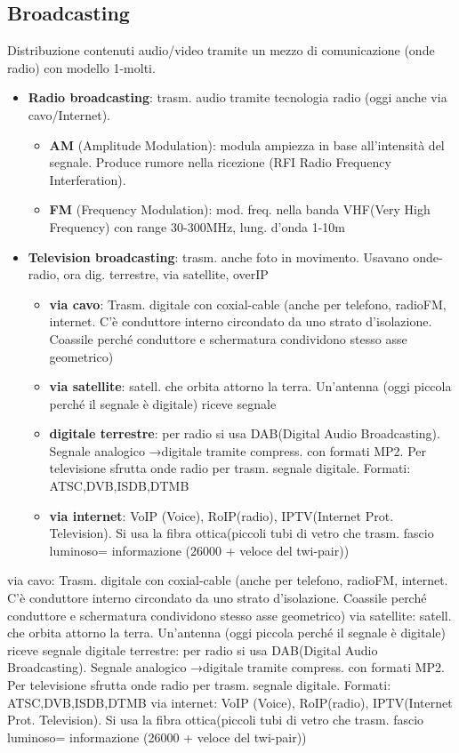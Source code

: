 \documentclass[8pt,a4paper]{article}
\begin{document}
\begin{multicols}{5}
    \subsection{Broadcasting}
    Distribuzione contenuti audio/video tramite un mezzo di comunicazione (onde radio) con modello 1-molti.
    \begin{itemize}
      \item \textbf{Radio broadcasting}: trasm. audio tramite tecnologia radio (oggi anche via cavo/Internet). 
      \begin{itemize}
        \item \textbf{AM} (Amplitude Modulation): modula ampiezza in base all’intensità del segnale. Produce rumore nella ricezione (RFI Radio Frequency Interferation).
        \item \textbf{FM} (Frequency Modulation): mod. freq. nella banda VHF(Very High Frequency) con range 30-300MHz, lung. d’onda 1-10m
      \end{itemize}
      \item \textbf{Television broadcasting}: trasm. anche foto in movimento. Usavano onde-radio, ora dig. terrestre, via satellite, overIP
      \begin{itemize}
        \item \textbf{via cavo}: Trasm. digitale con coxial-cable (anche per telefono, radioFM, internet. C’è conduttore interno circondato da uno strato d’isolazione. Coassile perché conduttore e schermatura condividono stesso asse geometrico)
        \item \textbf{via satellite}: satell. che orbita attorno la terra. Un’antenna (oggi piccola perché il segnale è digitale) riceve segnale
        \item \textbf{digitale terrestre}: per radio si usa DAB(Digital Audio Broadcasting). Segnale analogico →digitale tramite compress. con formati MP2. Per televisione sfrutta onde radio per trasm. segnale digitale. Formati: ATSC,DVB,ISDB,DTMB
        \item \textbf{via internet}: VoIP (Voice), RoIP(radio), IPTV(Internet Prot. Television). Si usa la fibra ottica(piccoli tubi di vetro che trasm. fascio luminoso= informazione (26000 + veloce del twi-pair))
      \end{itemize}
    \end{itemize}
    via cavo: Trasm. digitale con coxial-cable (anche per telefono, radioFM, internet. C’è conduttore interno circondato da uno strato d’isolazione. Coassile perché conduttore e schermatura condividono stesso asse geometrico)
    via satellite: satell. che orbita attorno la terra. Un’antenna (oggi piccola perché il segnale è digitale) riceve segnale
    digitale terrestre: per radio si usa DAB(Digital Audio Broadcasting). Segnale analogico →digitale tramite compress. con formati MP2. Per televisione sfrutta onde radio per trasm. segnale digitale. Formati: ATSC,DVB,ISDB,DTMB
    via internet: VoIP (Voice), RoIP(radio), IPTV(Internet Prot. Television). Si usa la fibra ottica(piccoli tubi di vetro che trasm. fascio luminoso= informazione (26000 + veloce del twi-pair))


\end{multicols}
\end{document}
